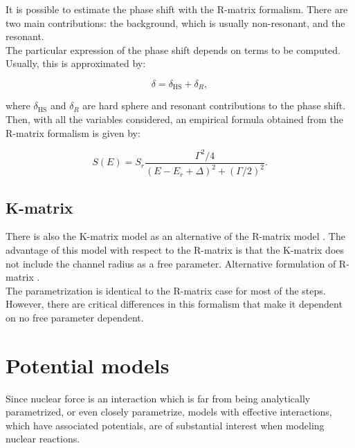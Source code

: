 \documentclass[openany]{book}
\begin{document}
It is possible to estimate the phase shift with the R-matrix formalism. There are two main contributions: the background, which is usually non-resonant, and the resonant. \\

The particular expression of the phase shift depends on terms to be computed. Usually, this is approximated by:

\begin{equation}  \label{eq:rmatrix_phaseShift}
	\delta = \delta_{\mathrm{HS}} + \delta_R,
\end{equation}

where $\delta_{\mathrm{HS}}$ and $\delta_R$ are hard sphere and resonant contributions to the phase shift. \\

Then, with all the variables considered, an empirical formula obtained from the R-matrix formalism is given by:

\begin{equation} \label{eq:rmatrix_sfactor}
	S(E) = S_r \frac{\Gamma^2/4}{(E-E_r + \Delta)^2 + (\Gamma/2)^2}.
\end{equation}

\subsection{K-matrix} \label{sub:kmatrix}

There is also the K-matrix model as an alternative of the R-matrix model \cite{humblet_1990}. The advantage of this model with respect to the R-matrix is that the K-matrix does not include the channel radius as a free parameter.  Alternative formulation of R-matrix \cite{brune_2002}. \\

The parametrization is identical to the R-matrix case for most of the steps. However, there are critical differences in this formalism that make it dependent on no free parameter dependent. 

\section{Potential models} \label{sec:potentialModels}


Since nuclear force is an interaction which is far from being analytically parametrized, or even closely parametrize, models with effective interactions, which have associated potentials, are of substantial interest when modeling nuclear reactions.  \\
\end{document}
